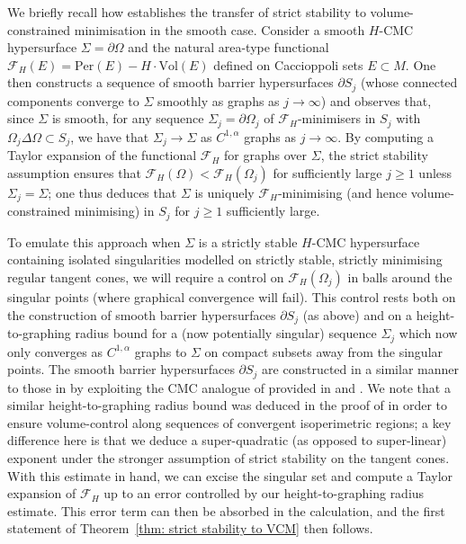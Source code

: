 \documentclass[12pt]{article}
\begin{document}
We briefly recall how \cite{W94} establishes the transfer of strict stability to volume-constrained minimisation in the smooth case. Consider a smooth $H$-CMC hypersurface $\Sigma = \partial \Omega$ and the natural area-type functional $\mathcal{F}_H(E) = \mathrm{Per}(E) - H \cdot \mathrm{Vol}(E)$ defined on Caccioppoli sets $E \subset M$. One then constructs a sequence of smooth barrier hypersurfaces $\partial S_j$ (whose connected components converge to $\Sigma$ smoothly as graphs as $j \rightarrow \infty$) and observes that, since $\Sigma$ is smooth, for any sequence $\Sigma_j = \partial \Omega_j$ of $\mathcal{F}_H$-minimisers in $S_j$ with $\Omega_j \Delta \Omega \subset S_j$, we have that $\Sigma_j \rightarrow \Sigma$ as $C^{1,\alpha}$ graphs as $j \rightarrow \infty$. By computing a Taylor expansion of the functional $\mathcal{F}_H$ for graphs over $\Sigma$, the strict stability assumption ensures that $\mathcal{F}_H(\Omega) < \mathcal{F}_H(\Omega_j)$ for sufficiently large $j \geq 1$ unless $\Sigma_j = \Sigma$; one thus deduces that $\Sigma$ is uniquely $\mathcal{F}_H$-minimising (and hence volume-constrained minimising) in $S_j$ for $j \geq 1$ sufficiently large. 


\bigskip

To emulate this approach when $\Sigma$ is a strictly stable $H$-CMC hypersurface containing isolated singularities modelled on strictly stable, strictly minimising regular tangent cones, we will require a control on $\mathcal{F}_H(\Omega_j)$ in balls around the singular points (where graphical convergence will fail). This control rests both on the construction of smooth barrier hypersurfaces $\partial S_j$ (as above) and on a height-to-graphing radius bound for a (now potentially singular) sequence $\Sigma_j$ which now only converges as $C^{1,\alpha}$ graphs to $\Sigma$ on compact subsets away from the singular points. The smooth barrier hypersurfaces $\partial S_j$ are constructed in a similar manner to those in \cite[Lemma 4]{S00} by exploiting the CMC analogue of \cite{HS85} provided in \cite{L23} and \cite{BL25}. We note that a similar height-to-graphing radius bound was deduced in the proof of \cite[Theorem 4]{MNP25} in order to ensure volume-control along sequences of convergent isoperimetric regions; a key difference here is that we deduce a super-quadratic (as opposed to super-linear) exponent under the stronger assumption of strict stability on the tangent cones. With this estimate in hand, we can excise the singular set and compute a Taylor expansion of $\mathcal{F}_H$ up to an error controlled by our height-to-graphing radius estimate. This error term can then be absorbed in the calculation, and the first statement of Theorem~\ref{thm: strict stability to VCM} then follows. 
\end{document}
